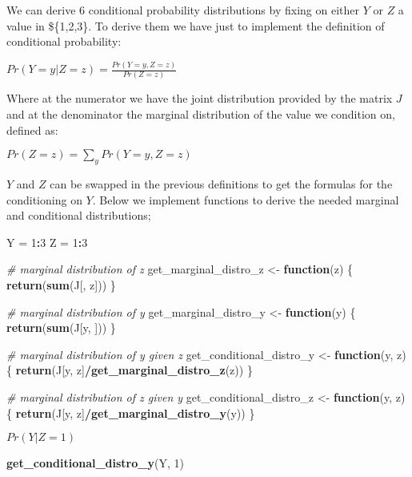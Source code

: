 \documentclass[
]{article}
\newenvironment{Shaded}{\begin{snugshade}}{\end{snugshade}}
\newcommand{\CommentTok}[1]{\textcolor[rgb]{0.56,0.35,0.01}{\textit{#1}}}
\newcommand{\ControlFlowTok}[1]{\textcolor[rgb]{0.13,0.29,0.53}{\textbf{#1}}}
\newcommand{\DecValTok}[1]{\textcolor[rgb]{0.00,0.00,0.81}{#1}}
\newcommand{\FunctionTok}[1]{\textcolor[rgb]{0.13,0.29,0.53}{\textbf{#1}}}
\newcommand{\NormalTok}[1]{#1}
\newcommand{\OtherTok}[1]{\textcolor[rgb]{0.56,0.35,0.01}{#1}}
\newcommand{\SpecialCharTok}[1]{\textcolor[rgb]{0.81,0.36,0.00}{\textbf{#1}}}
\begin{document}
We can derive 6 conditional probability distributions by fixing on
either \(Y\) or \(Z\) a value in \$\{1,2,3\}. To derive them we have
just to implement the definition of conditional probability:

\(Pr(Y = y | Z = z) = \frac{Pr(Y = y, Z = z)}{Pr(Z = z)}\)

Where at the numerator we have the joint distribution provided by the
matrix \(J\) and at the denominator the marginal distribution of the
value we condition on, defined as:

\(Pr(Z = z) = \sum_yPr(Y = y, Z = z)\)

\(Y\) and \(Z\) can be swapped in the previous definitions to get the
formulas for the conditioning on \(Y\). Below we implement functions to
derive the needed marginal and conditional distributions;

\begin{Shaded}
\begin{Highlighting}[]
\NormalTok{Y }\OtherTok{=} \DecValTok{1}\SpecialCharTok{:}\DecValTok{3}
\NormalTok{Z }\OtherTok{=} \DecValTok{1}\SpecialCharTok{:}\DecValTok{3}

\CommentTok{\# marginal distribution of z}
\NormalTok{get\_marginal\_distro\_z }\OtherTok{\textless{}{-}} \ControlFlowTok{function}\NormalTok{(z) \{}
    \FunctionTok{return}\NormalTok{(}\FunctionTok{sum}\NormalTok{(J[, z]))}
\NormalTok{\}}

\CommentTok{\# marginal distribution of y}
\NormalTok{get\_marginal\_distro\_y }\OtherTok{\textless{}{-}} \ControlFlowTok{function}\NormalTok{(y) \{}
    \FunctionTok{return}\NormalTok{(}\FunctionTok{sum}\NormalTok{(J[y, ]))}
\NormalTok{\}}

\CommentTok{\# marginal distribution of y given z}
\NormalTok{get\_conditional\_distro\_y }\OtherTok{\textless{}{-}} \ControlFlowTok{function}\NormalTok{(y, z) \{}
    \FunctionTok{return}\NormalTok{(J[y, z]}\SpecialCharTok{/}\FunctionTok{get\_marginal\_distro\_z}\NormalTok{(z))}
\NormalTok{\}}

\CommentTok{\# marginal distribution of z given y}
\NormalTok{get\_conditional\_distro\_z }\OtherTok{\textless{}{-}} \ControlFlowTok{function}\NormalTok{(y, z) \{}
    \FunctionTok{return}\NormalTok{(J[y, z]}\SpecialCharTok{/}\FunctionTok{get\_marginal\_distro\_y}\NormalTok{(y))}
\NormalTok{\}}
\end{Highlighting}
\end{Shaded}

\(Pr(Y | Z=1)\)

\begin{Shaded}
\begin{Highlighting}[]
\FunctionTok{get\_conditional\_distro\_y}\NormalTok{(Y, }\DecValTok{1}\NormalTok{)}
\end{Highlighting}
\end{Shaded}
\end{document}
